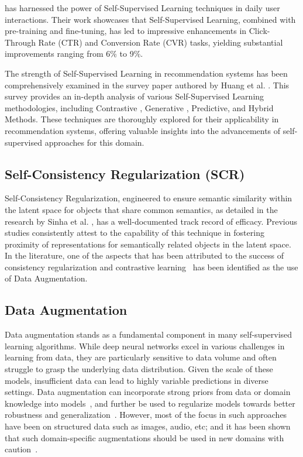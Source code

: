 \cite{introduction_4} has harnessed the power of Self-Supervised Learning techniques in daily user interactions. Their work showcases that Self-Supervised Learning, combined with pre-training and fine-tuning, has led to impressive enhancements in Click-Through Rate (CTR) and Conversion Rate (CVR) tasks, yielding substantial improvements ranging from 6\% to 9\%. 

The strength of Self-Supervised Learning in recommendation systems has been comprehensively examined in the survey paper authored by Huang et al. \cite{self_rec_survey}. This survey provides an in-depth analysis of various Self-Supervised Learning methodologies, including Contrastive \cite{contrastive_survey}, Generative \cite{generative_survey}, Predictive, and Hybrid Methods. These techniques are thoroughly explored for their applicability in recommendation systems, offering valuable insights into the advancements of self-supervised approaches for this domain.


\subsection{Self-Consistency Regularization (SCR)}
Self-Consistency Regularization, engineered to ensure semantic similarity within the latent space for objects that share common semantics, as detailed in the research by Sinha et al. \cite{sinha2021consistency}, has a well-documented track record of efficacy. 
Previous studies consistently attest to the capability of this technique in fostering proximity of representations for semantically related objects in the latent space.
In the literature, one of the aspects that has been attributed to the success of consistency regularization and contrastive learning~\cite{zhang2022rethinking} has been identified as the use of Data Augmentation.

\subsection{Data Augmentation}
Data augmentation stands as a fundamental component in many self-supervised learning algorithms. While deep neural networks excel in various challenges in learning from data, they are particularly sensitive to data volume \cite{augmentation1} and often struggle to grasp the underlying data distribution. Given the scale of these models, insufficient data can lead to highly variable predictions in diverse settings.
Data augmentation can incorporate strong priors from data or domain knowledge into models~\cite{eghbalzadeh2024rethinking}, and further be used to regularize models towards better robustness and generalization~\cite{zhang2017mixup,yun2019cutmix}. However, most of the focus in such approaches have been on structured data such as images, audio, etc; and it has been shown that such domain-specific augmentations should be used in new domains with caution~\cite{eghbalzadeh2024rethinking}.
